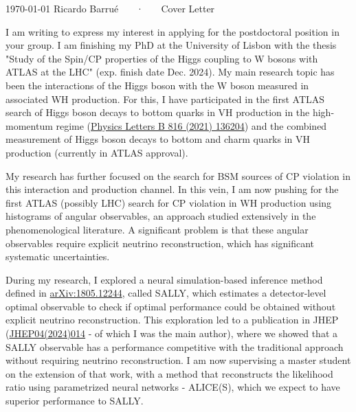 \documentclass[11pt, a4paper]{awesome-cv}
\begin{document}
\makecvheader[R]

\makecvfooter
  {\today}
  {Ricardo Barrué ~~~·~~~ Cover Letter}
  {}

\makelettertitle

\begin{cvletter}

I am writing to express my interest in applying for the postdoctoral position in your group. I am finishing my PhD at the University of Lisbon with the thesis "Study of the Spin/CP properties of the Higgs coupling to W bosons with ATLAS at the LHC" (exp. finish date Dec. 2024). My main research topic has been the interactions of the Higgs boson with the W boson measured in associated WH production. For this, I have participated in the first ATLAS search of Higgs boson decays to bottom quarks in VH production in the high-momentum regime (\href{https://doi.org/10.1016/j.physletb.2021.136204}{Physics Letters B 816 (2021) 136204}) and the combined measurement of Higgs boson decays to bottom and charm quarks in VH production (currently in ATLAS approval).

My research has further focused on the search for BSM sources of CP violation in this interaction and production channel. In this vein, I am now pushing for the first ATLAS (possibly LHC) search for CP violation in WH production using histograms of angular observables, an approach studied extensively in the phenomenological literature. A significant problem is that these angular observables require explicit neutrino reconstruction, which has significant systematic uncertainties. 

During my research, I explored a neural simulation-based inference method defined in \href{http://dx.doi.org/10.1073/pnas.1915980117}{arXiv:1805.12244}, called SALLY, which estimates a detector-level optimal observable to check if optimal performance could be obtained without explicit neutrino reconstruction. This exploration led to a publication in JHEP (\href{http://dx.doi.org/10.1007/JHEP04(2024)014}{JHEP04(2024)014} - of which I was the main author), where we showed that a SALLY observable has a performance competitive with the traditional approach without requiring neutrino reconstruction. I am now supervising a master student on the extension of that work, with a method that reconstructs the likelihood ratio using parametrized neural networks - ALICE(S), which we expect to have superior performance to SALLY.


\end{cvletter}
\end{document}
